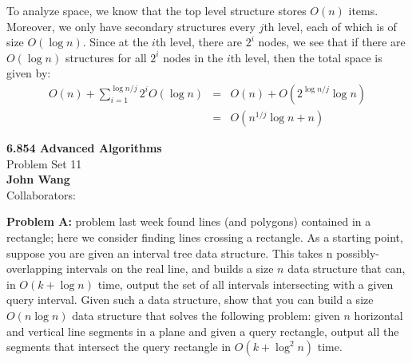 \documentclass[psamsfonts]{amsart}
\newenvironment{sol}{\vspace{0.25cm}{\large \bfseries Solution:}}{\qedsymbol}
\newenvironment{prob}[1]{\begin{framed}{\large \bfseries Problem #1:}}{\end{framed}}
\newcommand{\makenewtitle}{
    \begin{center}
    {\huge \bfseries 6.854 Advanced Algorithms} \\
    Problem Set 11\\
    \vspace{0.25cm}
    {\bfseries John Wang} \\
    Collaborators:  
    \end{center}
    \vspace{0.5cm}
}
\begin{document}
\begin{sol}
To analyze space, we know that the top level structure stores $O(n)$ items. Moreover, we only have secondary structures every $j$th level, each of which is of size $O(\log n)$. Since at the $i$th level, there are $2^i$ nodes, we see that if there are $O(\log n)$ structures for all $2^i$ nodes in the $i$th level, then the total space is given by:
\begin{eqnarray}
O(n) + \sum_{i=1}^{\log n/j} 2^i O(\log n) &=& O(n) + O(2^{\log n/j} \log n) \\
&=& O(n^{1/j} \log n + n)
\end{eqnarray}

\end{sol}

\newpage
\makenewtitle
\begin{prob}{2}
A problem last week found lines (and polygons) contained in a rectangle; here we consider finding lines crossing a rectangle. As a starting point, suppose you are given an interval tree data structure. This takes n possibly-overlapping intervals on the real line, and builds a size $n$ data structure that can, in $O(k + \log n)$ time, output the set of all intervals intersecting with a given query interval. Given such a data structure, show that you can build a size $O(n \log n)$ data structure that solves the following problem: given $n$ horizontal and vertical line segments in a plane and given a query rectangle, output all the segments that intersect the query rectangle in $O(k + \log^2 n)$ time. 
\end{prob}
\end{document}
